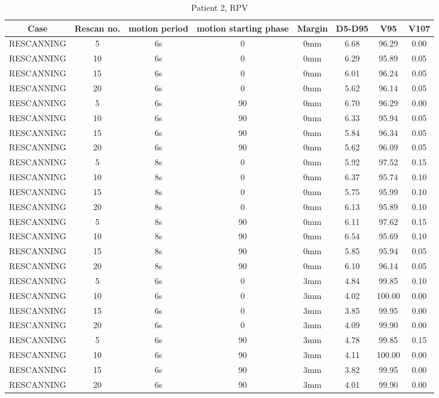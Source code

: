 \documentclass[type=dr, dr=rernat, accentcolor=tud7b,colorbacktitle, bigchapter, openright, twoside, 12pt ]{tudthesis}
\begin{document}
\begin{table}[H]
  \centering
   \scriptsize 
  \caption{Patient 2, RPV}
  \begin{tabular}{|c|c||c|c|c||c|c|c|}
    \hline\hline
    Case & Rescan no. & motion period & motion starting phase & Margin & D5-D95 & V95 & V107\\
    \hline 
RESCANNING & 5 & 6s & 0 & 0mm & 6.68 & 96.29 & 0.00 \\
RESCANNING & 10 & 6s & 0 & 0mm & 6.29 & 95.89 & 0.05 \\
RESCANNING & 15 & 6s & 0 & 0mm & 6.01 & 96.24 & 0.05 \\
RESCANNING & 20 & 6s & 0 & 0mm & 5.62 & 96.14 & 0.05 \\
RESCANNING & 5 & 6s & 90 & 0mm & 6.70 & 96.29 & 0.00 \\
RESCANNING & 10 & 6s & 90 & 0mm & 6.33 & 95.94 & 0.05 \\
RESCANNING & 15 & 6s & 90 & 0mm & 5.84 & 96.34 & 0.05 \\
RESCANNING & 20 & 6s & 90 & 0mm & 5.62 & 96.09 & 0.05 \\
RESCANNING & 5 & 8s & 0 & 0mm & 5.92 & 97.52 & 0.15 \\
RESCANNING & 10 & 8s & 0 & 0mm & 6.37 & 95.74 & 0.10 \\
RESCANNING & 15 & 8s & 0 & 0mm & 5.75 & 95.99 & 0.10 \\
RESCANNING & 20 & 8s & 0 & 0mm & 6.13 & 95.89 & 0.10 \\
RESCANNING & 5 & 8s & 90 & 0mm & 6.11 & 97.62 & 0.15 \\
RESCANNING & 10 & 8s & 90 & 0mm & 6.54 & 95.69 & 0.10 \\
RESCANNING & 15 & 8s & 90 & 0mm & 5.85 & 95.94 & 0.05 \\
RESCANNING & 20 & 8s & 90 & 0mm & 6.10 & 96.14 & 0.05 \\
RESCANNING & 5 & 6s & 0 & 3mm & 4.84 & 99.85 & 0.10 \\
RESCANNING & 10 & 6s & 0 & 3mm & 4.02 & 100.00 & 0.00 \\
RESCANNING & 15 & 6s & 0 & 3mm & 3.85 & 99.95 & 0.00 \\
RESCANNING & 20 & 6s & 0 & 3mm & 4.09 & 99.90 & 0.00 \\
RESCANNING & 5 & 6s & 90 & 3mm & 4.78 & 99.85 & 0.15 \\
RESCANNING & 10 & 6s & 90 & 3mm & 4.11 & 100.00 & 0.00 \\
RESCANNING & 15 & 6s & 90 & 3mm & 3.82 & 99.95 & 0.00 \\
RESCANNING & 20 & 6s & 90 & 3mm & 4.01 & 99.90 & 0.00 \\

\end{tabular}
\end{table}
\end{document}
